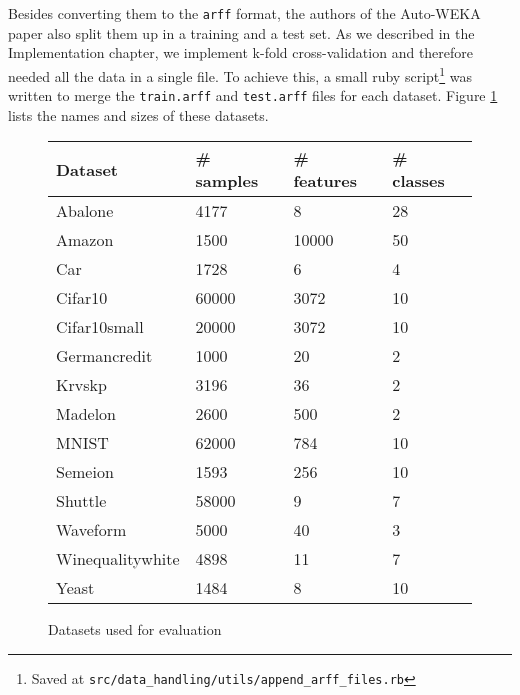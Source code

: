 \documentclass[a4paper,12pt,twoside,openright]{report}
\begin{document}
Besides converting them to the \texttt{arff} format, the authors of the Auto-WEKA paper also split them up in a training and a test set. As we described in the Implementation chapter, we implement k-fold cross-validation and therefore needed all the data in a single file. To achieve this, a small ruby script\footnote{Saved at \texttt{src/data\_handling/utils/append\_arff\_files.rb}} was written to merge the \texttt{train.arff} and \texttt{test.arff} files for each dataset. Figure \ref{datasets_info} lists the names and sizes of these datasets.


\begin{figure}
\centering

\begin{tabular}{|l|l|l|l|}
\hline
Dataset          & \# samples & \# features & \# classes \\ \hline\hline
Abalone          & 4177       & 8           & 28         \\ \hline
Amazon           & 1500       & 10000       & 50         \\ \hline
Car              & 1728       & 6           & 4          \\ \hline
Cifar10          & 60000      & 3072        & 10         \\ \hline
Cifar10small     & 20000      & 3072        & 10         \\ \hline
Germancredit     & 1000       & 20          & 2          \\ \hline
Krvskp           & 3196       & 36          & 2          \\ \hline
Madelon          & 2600       & 500         & 2          \\ \hline
MNIST            & 62000      & 784         & 10         \\ \hline
Semeion          & 1593       & 256         & 10         \\ \hline
Shuttle          & 58000      & 9           & 7          \\ \hline
Waveform         & 5000       & 40          & 3          \\ \hline
Winequalitywhite & 4898       & 11          & 7          \\ \hline
Yeast            & 1484       & 8           & 10         \\ \hline
\end{tabular}

\caption{Datasets used for evaluation}
\label{datasets_info}

\end{figure}
\end{document}
